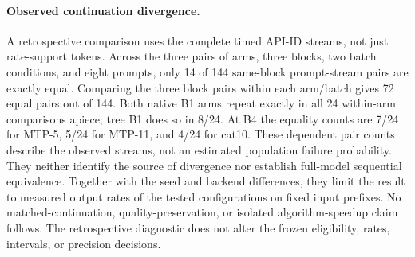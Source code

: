 \paragraph{Observed continuation divergence.}
A retrospective comparison uses the complete timed API-ID streams, not just rate-support tokens. Across the three pairs of arms, three blocks, two batch conditions, and eight prompts, only 14 of 144 same-block prompt-stream pairs are exactly equal. Comparing the three block pairs within each arm/batch gives 72 equal pairs out of 144. Both native B1 arms repeat exactly in all 24 within-arm comparisons apiece; tree B1 does so in 8/24. At B4 the equality counts are 7/24 for MTP-5, 5/24 for MTP-11, and 4/24 for cat10. These dependent pair counts describe the observed streams, not an estimated population failure probability. They neither identify the source of divergence nor establish full-model sequential equivalence. Together with the seed and backend differences, they limit the result to measured output rates of the tested configurations on fixed input prefixes. No matched-continuation, quality-preservation, or isolated algorithm-speedup claim follows. The retrospective diagnostic does not alter the frozen eligibility, rates, intervals, or precision decisions.
